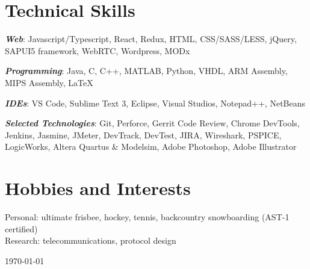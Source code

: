 \documentclass[letterpaper]{article}
\begin{document}
\section*{Technical Skills}
\emph{\textbf{Web}}: Javascript/Typescript, React, Redux, HTML, CSS/SASS/LESS, jQuery, SAPUI5
framework, WebRTC, Wordpress, MODx
\medskip

\emph{\textbf{Programming}}: Java, C, C++, MATLAB, Python, VHDL, ARM Assembly,
MIPS Assembly, \LaTeX\\
\medskip

\emph{\textbf{IDEs}}: VS Code, Sublime Text 3, Eclipse, Visual Studios,
Notepad++, NetBeans
\medskip

\emph{\textbf{Selected Technologies}}: Git, Perforce, Gerrit Code
Review, Chrome DevTools, Jenkins, Jasmine, JMeter, DevTrack, DevTest, JIRA,
Wireshark, PSPICE, LogicWorks, Altera Quartus \& Modelsim, Adobe Photoshop,
Adobe Illustrator
\bigskip

\section*{Hobbies and Interests}
Personal: ultimate frisbee, hockey, tennis, backcountry snowboarding (AST-1
certified)
\\
Research: telecommunications, protocol design

\vfill \hfill \monthyeardate\today
\end{document}
